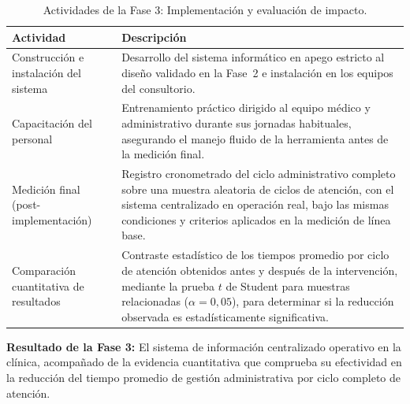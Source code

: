 \begin{table}[H]
\centering
\begin{tabular}{|p{4.5cm}|p{9cm}|}
\hline
\textbf{Actividad} & \textbf{Descripción} \\ \hline
Construcción e
instalación del sistema
  & Desarrollo del sistema informático en apego estricto al
    diseño validado en la Fase~2 e instalación en los equipos
    del consultorio. \\ \hline
Capacitación del
personal
  & Entrenamiento práctico dirigido al equipo médico y
    administrativo durante sus jornadas habituales, asegurando
    el manejo fluido de la herramienta antes de la medición
    final. \\ \hline
Medición final
(post-implemen\-tación)
  & Registro cronometrado del ciclo administrativo completo
    sobre una muestra aleatoria de ciclos de atención, con el
    sistema centralizado en operación real, bajo las mismas
    condiciones y criterios aplicados en la medición de línea
    base. \\ \hline
Comparación cuantitativa
de resultados
  & Contraste estadístico de los tiempos promedio por ciclo
    de atención obtenidos antes y después de la intervención,
    mediante la prueba $t$ de Student para muestras
    relacionadas ($\alpha = 0{,}05$), para determinar si la
    reducción observada es estadísticamente significativa. \\ \hline
\end{tabular}
\caption{Actividades de la Fase 3: Implementación y evaluación
         de impacto.}
\label{tab:actividades_fase3}
\end{table}

\noindent\textbf{Resultado de la Fase 3:} El sistema de
información centralizado operativo en la clínica, acompañado
de la evidencia cuantitativa que comprueba su efectividad en
la reducción del tiempo promedio de gestión administrativa por
ciclo completo de atención.